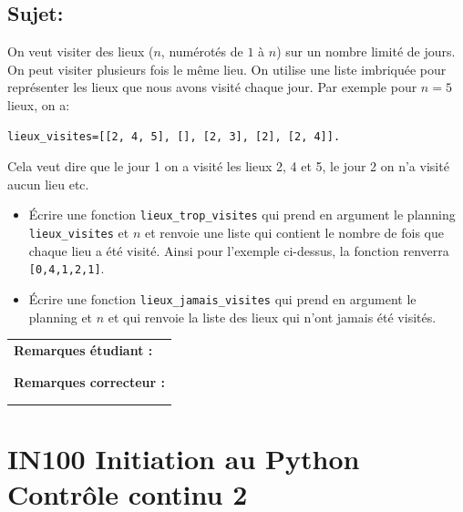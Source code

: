 \documentclass[a4paper,11pt]{article}
\begin{document}
\subsection*{Sujet:}


On veut visiter des lieux ($n$, numérotés de $1$ à $n$) sur un nombre limité de jours. 
On peut visiter plusieurs fois le même lieu. On utilise une liste imbriquée pour représenter 
les lieux que nous avons visité chaque jour. Par exemple pour $n = 5$ lieux, on
a:  

\begin{verbatim}
lieux_visites=[[2, 4, 5], [], [2, 3], [2], [2, 4]].
\end{verbatim}

Cela veut dire que le jour 1 on a visité les lieux 2, 4 et 5, le jour 2 on n'a visité aucun lieu etc. 

\begin{itemize}
\item[1.] Écrire une fonction \texttt{lieux\_trop\_visites} qui prend en argument le planning \texttt{lieux\_visites} et $n$ et renvoie une liste  qui contient le nombre de fois que chaque lieu 
a été visité. 
Ainsi pour l'exemple ci-dessus, la fonction renverra \texttt{[0,4,1,2,1]}.
\item[2.]  Écrire une fonction \texttt{lieux\_jamais\_visites} qui prend en argument le planning et $n$ et qui  renvoie
la liste des lieux qui n'ont jamais été visités.
\end{itemize}

\vspace{0.5 cm}

\begin{table}[h!]
\centering
\renewcommand{\arraystretch}{1.4} %
\begin{tabular}{|p{15cm}|}
\hline
\textbf{Remarques étudiant :}    \\
 \\
 \\
\hline
\textbf{Remarques correcteur :}  \\
 \\
 \\
\hline
\end{tabular}
\end{table}


\newpage

\section*{\center IN100 Initiation au Python\\
Contrôle continu 2}
\end{document}

